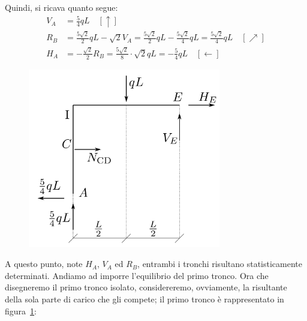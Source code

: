 Quindi, si ricava quanto segue:
\begin{subequations}
\begin{align}
V_{A} &= \frac{5}{4}qL  \quad [\uparrow] \label{equazione10-1-2a} \tag{10.1.2a} \\
R_{B} &= \frac{5\sqrt{2}}{2}qL - \sqrt{2}V_{A} = \frac{5\sqrt{2}}{2}qL - \frac{5\sqrt{2}}{4}qL = \frac{5\sqrt{2}}{4}qL \quad [\nearrow] \label{equazione10-1-2b} \tag{10.1.2b} \\ 
H_{A} &= -\frac{\sqrt{2}}{2}R_{B} = \frac{5\sqrt{2}}{8}\cdot \sqrt{2} qL = - \frac{5}{4}qL \quad [\leftarrow] \label{equazione10-1-2c} \tag{10.1.2c}
\end{align}
\end{subequations}
\renewcommand{\thefigure}{10.1~-~3}
\begin{figure}[ht]
\centering
\includegraphics[width=0.75\textwidth]{Immagini/Parte_10/Esercizio10_1_1/Esercizio10_1_3.pdf}
\caption{}
\label{Esercizio10-1-3}
\end{figure}
A questo punto, note $H_{A}$, $V_{A}$ ed $R_{B}$, entrambi i tronchi risultano statisticamente determinati. Andiamo ad imporre l'equilibrio del primo tronco. Ora che disegneremo il primo tronco isolato, considereremo, ovviamente, la risultante della sola parte di carico che gli compete; il primo tronco è rappresentato in figura~\ref{Esercizio10-1-3}: 
